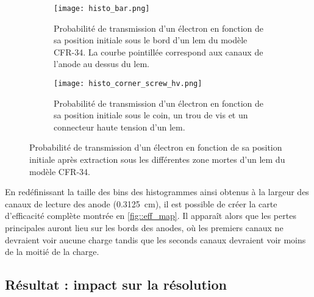       \begin{figure}[htbp]
        \begin{subfigure}[t]{0.48\textwidth}
          \centering
          \texttt{[image: histo\_bar.png]}
          \caption{Probabilité de transmission d'un électron en fonction de sa position initiale sous le bord d'un \gls{lem} du modèle CFR-34. La courbe pointillée correspond aux canaux de l'anode au dessus du \gls{lem}.}
        \end{subfigure}
        \hfill
        \begin{subfigure}[t]{0.48\textwidth}
          \centering
          \texttt{[image: histo\_corner\_screw\_hv.png]}
          \caption{Probabilité de transmission d'un électron en fonction de sa position initiale sous le coin, un trou de vis et un connecteur haute tension d'un \gls{lem}.}
        \end{subfigure}
        \caption[Probabilité de transmission des zones mortes d'un \gls{lem}.]{\label{fig::histo_eff}Probabilité de transmission d'un électron en fonction de sa position initiale après extraction sous les différentes zone mortes d'un \gls{lem} du modèle CFR-34.}
      \end{figure}
            
      En redéfinissant la taille des bins des histogrammes ainsi obtenus à la largeur des canaux de lecture des anode (\SI{0.3125}{\centi\meter}), il est possible de créer la carte d'efficacité complète montrée en \autoref{fig::eff_map}. Il apparaît alors que les pertes principales auront lieu sur les bords des anodes, où les premiers canaux ne devraient voir aucune charge tandis que les seconds canaux devraient voir moins de la moitié de la charge.
            
%            
            
    \subsection{Résultat : impact sur la résolution}
            
